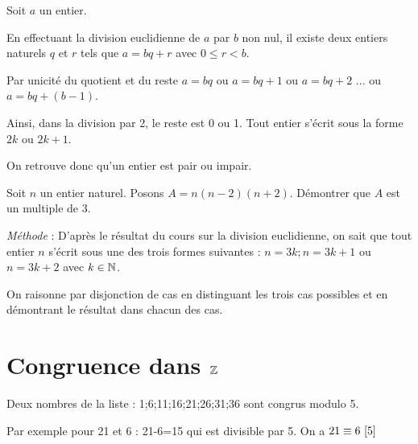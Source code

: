 \documentclass[10pt,a4paper]{article}
\begin{document}


\dem Soit $a$ un entier.

En effectuant la division euclidienne de $a$ par $b$ non nul, il existe deux entiers naturels $q$ et $r$ tels que $a=bq+r$ avec $0 \leq r <b$.

Par unicité du quotient et du reste $a=bq$ ou $a=bq+1$ ou $a=bq+2$  ... ou $a=bq+(b-1)$.

\medskip

\rema Ainsi, dans la division par 2, le reste est 0 ou 1. Tout entier s'écrit sous la forme $2k$ ou $2k+1$.

On retrouve donc qu'un entier est pair ou impair.

\medskip

\exe Soit $n$ un entier naturel. Posons $A=n(n-2)(n+2)$. Démontrer que $A$ est un multiple de 3.

\textit{Méthode }: D'après le résultat du cours sur la division euclidienne, on sait que tout entier $n$ s'écrit sous une des trois formes suivantes : $n=3k;n=3k+1$ ou $n=3k+2$ avec $k \in \mathbb{N}$.

On raisonne par disjonction de cas en distinguant les trois cas possibles et en démontrant le résultat dans chacun des cas. 


\section{Congruence dans $\mathbb{Z}$}




\exe Deux nombres de la liste : 1;6;11;16;21;26;31;36 sont congrus modulo 5.

Par exemple pour 21 et 6 : 21-6=15 qui est divisible par 5. On a ${21} \equiv {6} ~ [{5}]$


\dem
\end{document}
